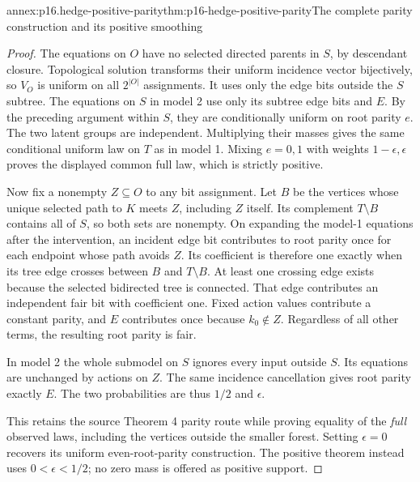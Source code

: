 \begin{annexitem}{annex:p16.hedge-positive-parity}{thm:p16-hedge-positive-parity}{The complete parity construction and its positive smoothing}
\begin{proof}
The equations on \(O\) have no selected directed parents in
\(S\), by descendant closure. Topological solution transforms
their uniform incidence vector bijectively, so \(V_O\) is uniform
on all \(2^{|O|}\) assignments. It uses only the edge bits
outside the \(S\) subtree. The equations on \(S\) in model 2
use only its subtree edge bits and \(E\). By the preceding
argument within \(S\), they are conditionally uniform on root
parity \(e\). The two latent groups are independent. Multiplying
their masses gives the same conditional uniform law on \(T\)
as in model 1. Mixing \(e=0,1\) with weights \(1-\epsilon,\epsilon\)
proves the displayed common full law, which is strictly positive.

Now fix a nonempty \(Z\subseteq O\) to any bit assignment.
Let \(B\) be the vertices whose unique selected path to \(K\)
meets \(Z\), including \(Z\) itself. Its complement \(T\setminus B\)
contains all of \(S\), so both sets are nonempty. On expanding
the model-1 equations after the intervention, an incident edge bit
contributes to root parity once for each endpoint whose path avoids
\(Z\). Its coefficient is therefore one exactly when its tree
edge crosses between \(B\) and \(T\setminus B\). At least
one crossing edge exists because the selected bidirected tree is
connected. That edge contributes an independent fair bit with
coefficient one. Fixed action values contribute a constant parity,
and \(E\) contributes once because \(k_0\notin Z\).
Regardless of all other terms, the resulting root parity is fair.

In model 2 the whole submodel on \(S\) ignores every input
outside \(S\). Its equations are unchanged by actions on \(Z\).
The same incidence cancellation gives root parity exactly \(E\).
The two probabilities are thus \(1/2\) and \(\epsilon\).

This retains the source Theorem 4 parity route while proving equality
of the \emph{full} observed laws, including the vertices outside
the smaller forest. Setting \(\epsilon=0\) recovers its uniform
even-root-parity construction. The positive theorem instead uses
\(0<\epsilon<1/2\); no zero mass is offered as positive support.
\end{proof}
\end{annexitem}

